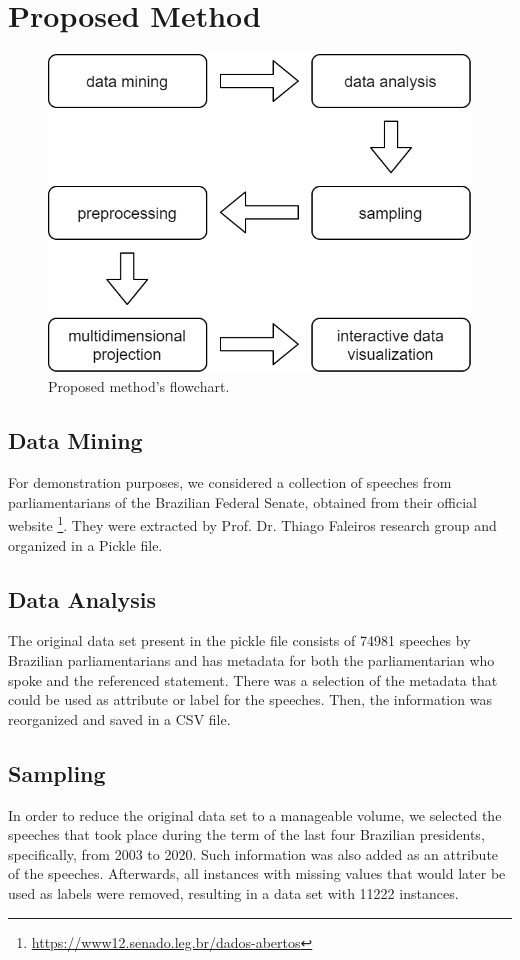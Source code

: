 \documentclass[conference]{IEEEtran}
\begin{document}
\section{Proposed Method}

\begin{figure}[htbp]
\centering
\includegraphics[width=.4\textwidth]{flowchart2.png}
\caption{Proposed method's flowchart.}
\label{fig}
\end{figure}

\subsection{Data Mining}

For demonstration purposes, we considered a collection of speeches from parliamentarians of the Brazilian Federal Senate, obtained from their official website \footnote{\url{https://www12.senado.leg.br/dados-abertos}}. They were extracted by Prof. Dr. Thiago Faleiros research group and organized in a Pickle file.

\subsection{Data Analysis}

The original data set present in the pickle file consists of 74981 speeches by Brazilian parliamentarians and has metadata for both the parliamentarian who spoke and the referenced statement. There was a selection of the metadata that could be used as attribute or label for the speeches. Then, the information was reorganized and saved in a CSV file.

\subsection{Sampling}

In order to reduce the original data set to a manageable volume, we selected the speeches that took place during the term of the last four Brazilian presidents, specifically, from 2003 to 2020. Such information was also added as an attribute of the speeches. Afterwards, all instances with missing values that would later be used as labels were removed, resulting in a data set with 11222 instances. 
\end{document}
